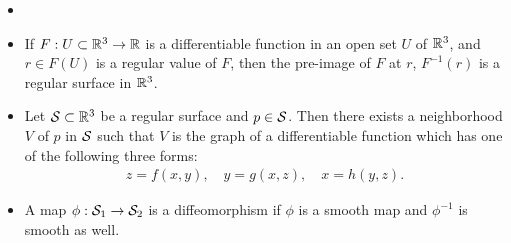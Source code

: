 \documentclass[11pt]{article}
\begin{document}
\begin{itemize}
\item {}

\item  \begin{theorem}\label{th: surf_regval}
If $F: U \subset {\mathbb R}^{3} \rightarrow {\mathbb R}$ is a differentiable function in an open set $U$ of ${\mathbb R}^{3}$, and $r\in F(U)$ is a regular value of $F$,  then the pre-image of $F$ at $r$, $F^{-1}(r)$ is a regular surface in ${\mathbb R}^{3}$.
\end{theorem}

\item \begin{proposition}\label{prop: local_diff_fun}
Let ${\mathcal S}\subset {\mathbb R}^{3}$ be a regular surface and $p\in {\mathcal S}$. Then there exists a neighborhood $V$ of $p$ in ${\mathcal S}$ such that $V$ is the graph of a differentiable function which has one of the following three forms: 
\begin{align*}
z = f(x,y),\quad y= g(x,z), \quad x= h(y,z). 
\end{align*}
\end{proposition}

\item A map $\phi: {\mathcal S}_{1} \rightarrow {\mathcal S}_{2}$ is a diffeomorphism if $\phi$ is a smooth map and $\phi^{-1}$ is smooth as well.
\end{itemize}
\end{document}
